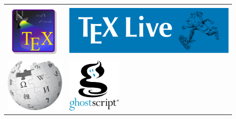 \begin{tabular}{llll}
\href{http://texstudio.sourceforge.net/}{\includegraphics[height=100px]{img/thanks/texstudio.png}} &
\multicolumn{3}{l}{\href{http://www.tug.org/texlive/}{\includegraphics[height=90px]{img/thanks/texlive.png}}}\\

\href{http://www.wikipedia.org/}{\includegraphics[height=100px]{img/thanks/wikipedia.png}} &
\href{http://www.ghostscript.com/}{\includegraphics[height=100px]{img/thanks/ghostscript.png}} &
&
\\
\end{tabular}

